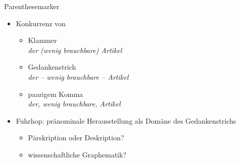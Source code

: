 \begin{frame}
  {Parenthesemarker}
  \begin{itemize}[<+->]
    \item Konkurrenz von
      \begin{itemize}[<+->]
        \item Klammer\\
          \textit{\alert{der (wenig brauchbare) Artikel}}
        \item Gedankenstrich\\
          \textit{\alert{der -- wenig brauchbare -- Artikel}}
        \item paarigem Komma\\
          \textit{\alert{der, wenig brauchbare, Artikel}}
      \end{itemize}
      \Zeile
    \item Fuhrhop: pränominale Herausstellung als Domäne des Gedankenstrichs
      \begin{itemize}[<+->]
        \item Pärskription oder Deskription?
        \item wissenschaftliche Graphematik?
      \end{itemize}
  \end{itemize}
\end{frame}

